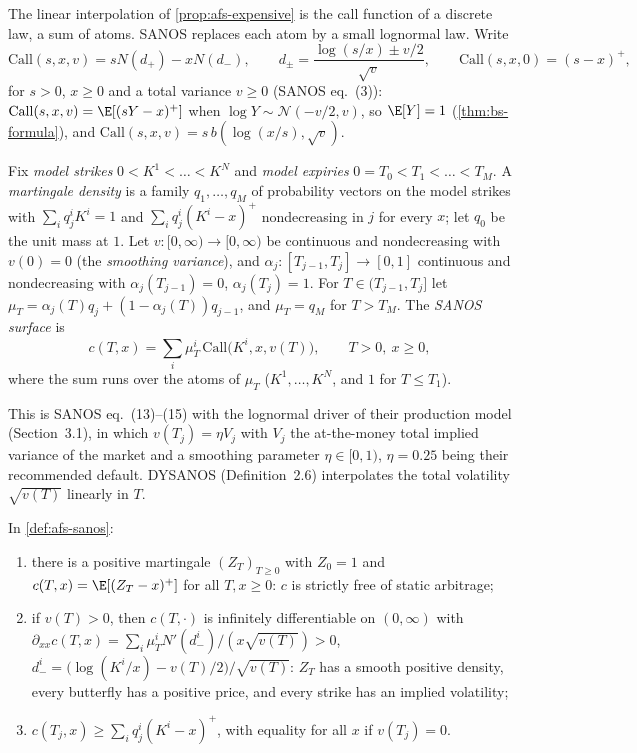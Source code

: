 The linear interpolation of \cref{prop:afs-expensive} is the call function of a discrete law, a sum of
atoms. SANOS replaces each atom by a small lognormal law. Write
\begin{equation}\label{eq:afs-call}
  \mathrm{Call}(s,x,v)=sN(d_+)-xN(d_-),\qquad d_\pm=\frac{\log(s/x)\pm v/2}{\sqrt v},\qquad\mathrm{Call}(s,x,0)=(s-x)^+,
\end{equation}
for $s>0$, $x\ge0$ and a total variance $v\ge0$ (SANOS eq.~(3)): $\mathrm{Call}(s,x,v)=\E[(sY-x)^+]$ when
$\log Y\sim\mathcal N(-v/2,v)$, so $\E[Y]=1$ (\cref{thm:bs-formula}), and $\mathrm{Call}(s,x,v)=s\,b(\log(x/s),\sqrt v)$.

\begin{definition}\label{def:afs-sanos}
Fix \emph{model strikes} $0<K^1<\dots<K^N$ and \emph{model expiries} $0=T_0<T_1<\dots<T_M$. A \emph{martingale
density} is a family $q_1,\dots,q_M$ of probability vectors on the model strikes with $\sum_iq_j^iK^i=1$ and
$\sum_iq_j^i(K^i-x)^+$ nondecreasing in $j$ for every $x$; let $q_0$ be the unit mass at $1$. Let $v:[0,\infty)\to[0,\infty)$
be continuous and nondecreasing with $v(0)=0$ (the \emph{smoothing variance}), and $\alpha_j:[T_{j-1},T_j]\to[0,1]$
continuous and nondecreasing with $\alpha_j(T_{j-1})=0$, $\alpha_j(T_j)=1$. For $T\in(T_{j-1},T_j]$ let
$\mu_T=\alpha_j(T)q_j+(1-\alpha_j(T))q_{j-1}$, and $\mu_T=q_M$ for $T>T_M$. The \emph{SANOS surface} is
\[
  c(T,x)=\sum_i\mu_T^i\,\mathrm{Call}\big(K^i,x,v(T)\big),\qquad T>0,\ x\ge0,
\]
where the sum runs over the atoms of $\mu_T$ ($K^1,\dots,K^N$, and $1$ for $T\le T_1$).
\end{definition}

This is SANOS eq.~(13)--(15) with the lognormal driver of their production model (Section~3.1), in which
$v(T_j)=\eta V_j$ with $V_j$ the at-the-money total implied variance of the market and a smoothing parameter
$\eta\in[0,1)$, $\eta=0.25$ being their recommended default. DYSANOS (Definition~2.6) interpolates the total
volatility $\sqrt{v(T)}$ linearly in $T$.

\begin{theorem}\label{thm:afs-sanos}
In \cref{def:afs-sanos}:
\begin{enumerate}[label=(\roman*)]
  \item there is a positive martingale $(Z_T)_{T\ge0}$ with $Z_0=1$ and $c(T,x)=\E[(Z_T-x)^+]$ for all $T,x\ge0$:
    $c$ is strictly free of static arbitrage;
  \item if $v(T)>0$, then $c(T,\cdot)$ is infinitely differentiable on $(0,\infty)$ with
    $\partial_{xx}c(T,x)=\sum_i\mu_T^iN'(d_-^i)/(x\sqrt{v(T)})>0$, $d_-^i=\big(\log(K^i/x)-v(T)/2\big)/\sqrt{v(T)}$: $Z_T$ has a
    smooth positive density, every butterfly has a positive price, and every strike has an implied volatility;
  \item $c(T_j,x)\ge\sum_iq_j^i(K^i-x)^+$, with equality for all $x$ if $v(T_j)=0$.
\end{enumerate}
\end{theorem}

